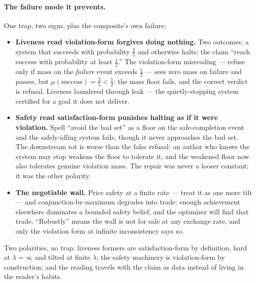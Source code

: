 \paragraph{The failure mode it prevents.} One trap, two signs, plus
the composite's own failure:
\begin{itemize}
\item \textbf{Liveness read violation-form forgives doing nothing.}
  Two outcomes; a system that succeeds with probability $\tfrac25$
  and otherwise halts; the claim ``reach success with probability at
  least $\tfrac12$.'' The violation-form misreading --- refuse only
  if mass on the \emph{failure} event exceeds $\tfrac12$ --- sees
  zero mass on failure and passes, but $\mu(\mathrm{success}) =
  \tfrac25 < \tfrac12$: the mass floor fails, and the correct
  verdict is refusal. Liveness laundered through leak --- the
  quietly-stopping system certified for a goal it does not deliver.
\item \textbf{Safety read satisfaction-form punishes halting as if it
  were violation.} Spell ``avoid the bad set'' as a floor on the
  safe-completion event and the safely-idling system fails, though it
  never approaches the bad set. The downstream rot is worse than the
  false refusal: an author who knows the system may stop weakens the
  floor to tolerate it, and the weakened floor now also tolerates
  genuine violation mass. The repair was never a looser constant; it
  was the other polarity.
\item \textbf{The negotiable wall.} Price safety at a finite rate ---
  treat it as one more tilt --- and conjunction-by-maximum degrades
  into trade: enough achievement elsewhere dominates a bounded
  safety belief, and the optimizer will find that trade.
  ``Robustly'' means the wall is not for sale at any exchange rate,
  and only the violation form at infinite inconsistency says so.
\end{itemize}
Two polarities, no trap: liveness formers are satisfaction-form by
definition, hard at $\lambda = \infty$ and tilted at finite $\lambda$;
the safety machinery is violation-form by construction; and the
reading travels with the claim as data instead of living in the
reader's habits.

